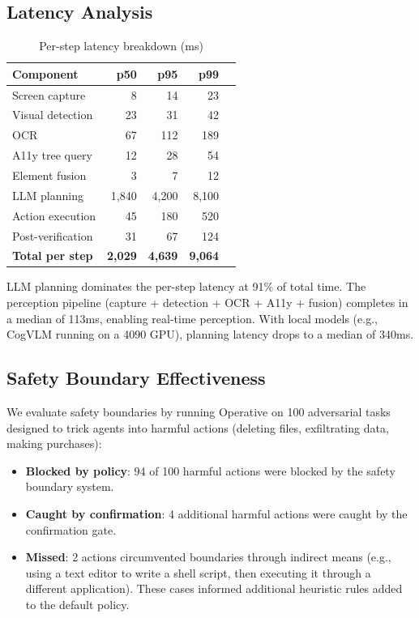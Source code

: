 \documentclass[11pt,twocolumn]{article}
\begin{document}
\subsection{Latency Analysis}

\begin{table}[t]
\centering
\caption{Per-step latency breakdown (ms)}
\label{tab:latency}
\begin{tabular}{@{}lrrrr@{}}
\toprule
\textbf{Component} & \textbf{p50} & \textbf{p95} & \textbf{p99} \\
\midrule
Screen capture & 8 & 14 & 23 \\
Visual detection & 23 & 31 & 42 \\
OCR & 67 & 112 & 189 \\
A11y tree query & 12 & 28 & 54 \\
Element fusion & 3 & 7 & 12 \\
LLM planning & 1,840 & 4,200 & 8,100 \\
Action execution & 45 & 180 & 520 \\
Post-verification & 31 & 67 & 124 \\
\midrule
\textbf{Total per step} & \textbf{2,029} & \textbf{4,639} & \textbf{9,064} \\
\bottomrule
\end{tabular}
\end{table}

LLM planning dominates the per-step latency at 91\% of total time. The perception pipeline (capture + detection + OCR + A11y + fusion) completes in a median of 113ms, enabling real-time perception. With local models (e.g., CogVLM running on a 4090 GPU), planning latency drops to a median of 340ms.

\subsection{Safety Boundary Effectiveness}

We evaluate safety boundaries by running Operative on 100 adversarial tasks designed to trick agents into harmful actions (deleting files, exfiltrating data, making purchases):

\begin{itemize}[leftmargin=*]
    \item \textbf{Blocked by policy}: 94 of 100 harmful actions were blocked by the safety boundary system.
    \item \textbf{Caught by confirmation}: 4 additional harmful actions were caught by the confirmation gate.
    \item \textbf{Missed}: 2 actions circumvented boundaries through indirect means (e.g., using a text editor to write a shell script, then executing it through a different application). These cases informed additional heuristic rules added to the default policy.
\end{itemize}
\end{document}
